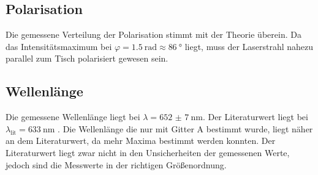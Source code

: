 \subsection{Polarisation}
Die gemessene Verteilung der Polarisation stimmt mit der Theorie überein. Da das Intensitätsmaximum bei $\varphi=\SI{1.5}{\radian}\approx\SI{86}{\degree}$
liegt, muss der Laserstrahl nahezu parallel zum Tisch polarisiert gewesen sein.

\subsection{Wellenlänge}
Die gemessene Wellenlänge liegt bei $\lambda = \SI{652(7)}{\nano\meter}$. Der Literaturwert liegt bei $\lambda_{\text{lit}}=\SI{633}{\nano\meter}$ 
\cite{leifi}.
Die Wellenlänge die nur mit Gitter A bestimmt wurde, liegt näher an dem Literaturwert, da mehr Maxima bestimmt werden konnten. 
Der Literaturwert liegt zwar nicht in den Unsicherheiten der gemessenen Werte, jedoch sind die Messwerte in der richtigen 
Größenordnung. 
\newpage